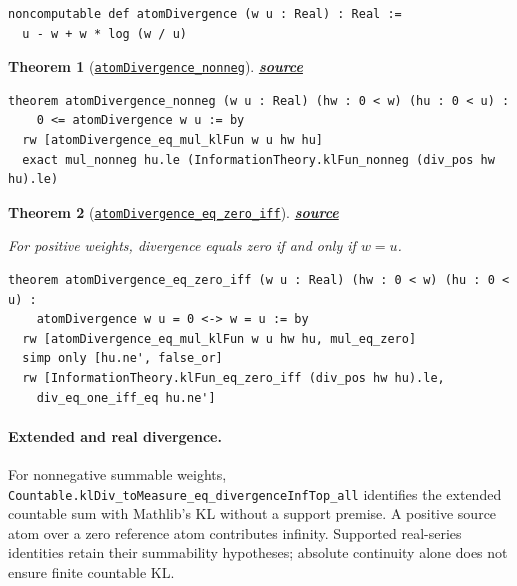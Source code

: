 \documentclass[11pt]{article}
\newtheorem{theorem}{Theorem}[section]
\theoremstyle{definition}
\theoremstyle{remark}
\begin{document}
\begin{lstlisting}[caption={Atom divergence}]
noncomputable def atomDivergence (w u : Real) : Real :=
  u - w + w * log (w / u)
\end{lstlisting}

\begin{theorem}[\href{https://github.com/zariuq/ks-foundations-of-inference/blob/main/KnuthSkilling/Information/Divergence.lean}{\texttt{atomDivergence\_nonneg}}]
\textbf{\href{https://github.com/zariuq/ks-foundations-of-inference/blob/main/KnuthSkilling/Information/Divergence.lean}{source}}
\end{theorem}

\begin{lstlisting}[caption={Divergence non-negativity}]
theorem atomDivergence_nonneg (w u : Real) (hw : 0 < w) (hu : 0 < u) :
    0 <= atomDivergence w u := by
  rw [atomDivergence_eq_mul_klFun w u hw hu]
  exact mul_nonneg hu.le (InformationTheory.klFun_nonneg (div_pos hw hu).le)
\end{lstlisting}

\begin{theorem}[\href{https://github.com/zariuq/ks-foundations-of-inference/blob/main/KnuthSkilling/Information/Divergence.lean}{\texttt{atomDivergence\_eq\_zero\_iff}}]
\textbf{\href{https://github.com/zariuq/ks-foundations-of-inference/blob/main/KnuthSkilling/Information/Divergence.lean}{source}}

For positive weights, divergence equals zero if and only if $w = u$.
\end{theorem}

\begin{lstlisting}[caption={Divergence equals zero iff $w = u$ (\href{https://github.com/zariuq/ks-foundations-of-inference/blob/main/KnuthSkilling/Information/Divergence.lean}{Divergence.lean})},numbers=none]
theorem atomDivergence_eq_zero_iff (w u : Real) (hw : 0 < w) (hu : 0 < u) :
    atomDivergence w u = 0 <-> w = u := by
  rw [atomDivergence_eq_mul_klFun w u hw hu, mul_eq_zero]
  simp only [hu.ne', false_or]
  rw [InformationTheory.klFun_eq_zero_iff (div_pos hw hu).le,
    div_eq_one_iff_eq hu.ne']
\end{lstlisting}

\paragraph{Extended and real divergence.}
For nonnegative summable weights, \texttt{Countable.klDiv\_toMeasure\_eq\_divergenceInfTop\_all}
identifies the extended countable sum with Mathlib's KL without a support premise.
A positive source atom over a zero reference atom contributes infinity.
Supported real-series identities retain their summability hypotheses;
absolute continuity alone does not ensure finite countable KL.
\end{document}

